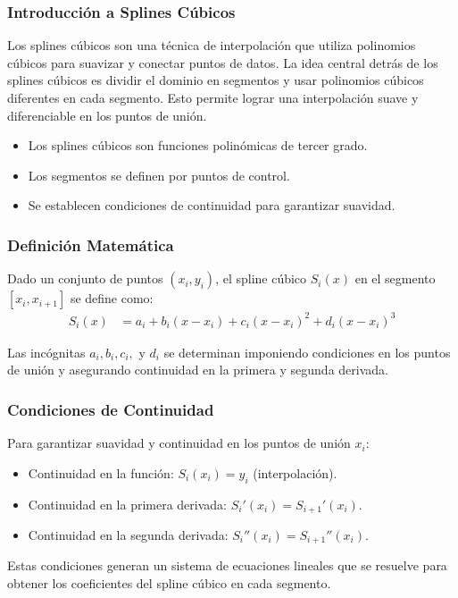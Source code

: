 \documentclass{beamer}
\begin{document}
\begin{frame}
	\frametitle{Introducción a Splines Cúbicos}
	Los splines cúbicos son una técnica de interpolación que utiliza polinomios cúbicos para suavizar y conectar puntos de datos. La idea central detrás de los splines cúbicos es dividir el dominio en segmentos y usar polinomios cúbicos diferentes en cada segmento. Esto permite lograr una interpolación suave y diferenciable en los puntos de unión.
	
	\begin{itemize}
		\item Los splines cúbicos son funciones polinómicas de tercer grado.
		\item Los segmentos se definen por puntos de control.
		\item Se establecen condiciones de continuidad para garantizar suavidad.
	\end{itemize}
\end{frame}

\begin{frame}
	\frametitle{Definición Matemática}
	Dado un conjunto de puntos $(x_i, y_i)$, el spline cúbico $S_i(x)$ en el segmento $[x_i, x_{i+1}]$ se define como:
	\begin{align*}
		S_i(x) &= a_i + b_i (x - x_i) + c_i (x - x_i)^2 + d_i (x - x_i)^3
	\end{align*}
	
	Las incógnitas $a_i, b_i, c_i,$ y $d_i$ se determinan imponiendo condiciones en los puntos de unión y asegurando continuidad en la primera y segunda derivada.
\end{frame}

\begin{frame}
	\frametitle{Condiciones de Continuidad}
	Para garantizar suavidad y continuidad en los puntos de unión $x_i$:
	
	\begin{itemize}
		\item Continuidad en la función: $S_i(x_i) = y_i$ (interpolación).
		\item Continuidad en la primera derivada: $S_i'(x_i) = S_{i+1}'(x_i)$.
		\item Continuidad en la segunda derivada: $S_i''(x_i) = S_{i+1}''(x_i)$.
	\end{itemize}
	
	Estas condiciones generan un sistema de ecuaciones lineales que se resuelve para obtener los coeficientes del spline cúbico en cada segmento.
\end{frame}
\end{document}
